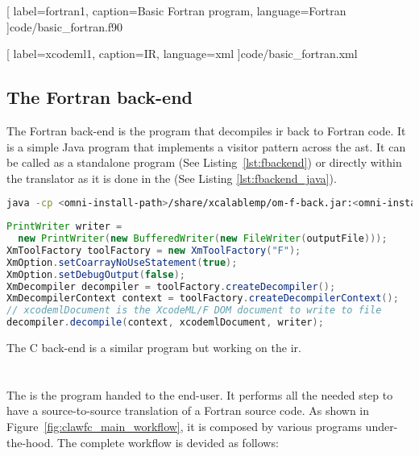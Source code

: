 
  [
    label=fortran1,
    caption=Basic Fortran program,
    language=Fortran
  ]{code/basic_fortran.f90}


  [
    label=xcodeml1,
    caption=\xcodemlf IR,
    language=xml
  ]{code/basic_fortran.xml}

\subsection{The Fortran back-end}
The Fortran back-end is the program that decompiles \gls{ir} back to Fortran
code. It is a simple Java program that implements a visitor pattern across
the \gls{ast}. It can be called as a standalone program
(See Listing~\ref{lst:fbackend}) or directly within the translator as it is
done in the \clawfcomp (See Listing \ref{lst:fbackend_java}).

\begin{lstlisting}[label=lst:fbackend, language=Bash, caption=Execute the
  Fortran back-end as a standalone]
java -cp <omni-install-path>/share/xcalablemp/om-f-back.jar:<omni-install-path>/share/xcalablemp/om-exc-tools.jar xcodeml.f.util.omx2f -l xcodeml.xml
\end{lstlisting}

\begin{lstlisting}[label=lst:fbackend_java, language=Java,
  caption=Fortran back-end called from Java]
PrintWriter writer =
  new PrintWriter(new BufferedWriter(new FileWriter(outputFile)));
XmToolFactory toolFactory = new XmToolFactory("F");
XmOption.setCoarrayNoUseStatement(true);
XmOption.setDebugOutput(false);
XmDecompiler decompiler = toolFactory.createDecompiler();
XmDecompilerContext context = toolFactory.createDecompilerContext();
// xcodemlDocument is the XcodeML/F DOM document to write to file
decompiler.decompile(context, xcodemlDocument, writer);
\end{lstlisting}

The C back-end is a similar program but working on the \xcodemlc{} \gls{ir}.

\section{\clawfcomp}
The \clawfc is the program handed to the end-user. It performs all the needed
step to have a source-to-source translation of a Fortran source code.
As shown in Figure~\ref{fig:clawfc_main_workflow},
it is composed by various programs under-the-hood.
The complete workflow is devided as follows:

